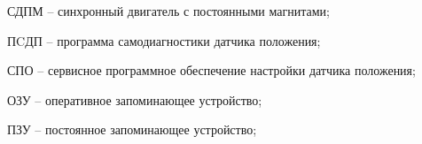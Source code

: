 \newpage
\begin{abbreviations}


СДПМ -- синхронный двигатель с постоянными магнитами;

ПCДП -- программа самодиагностики датчика положения;

СПО -- сервисное программное обеспечение настройки датчика положения;

ОЗУ -- оперативное запоминающее устройство;

ПЗУ -- постоянное запоминающее устройство;

\end{abbreviations}